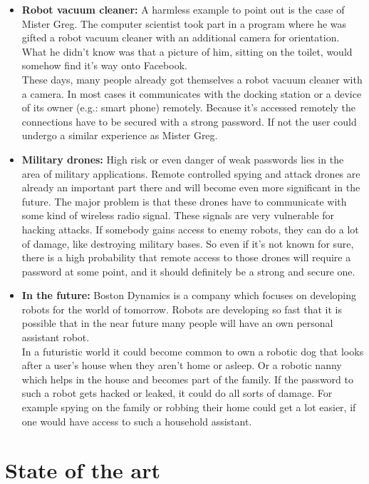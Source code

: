 \documentclass[conference]{IEEEtran}
\begin{document}
\begin{itemize}
    \item \textbf{Robot vacuum cleaner:} A harmless example to point out is the case of Mister Greg. The computer scientist took part in a program where he was gifted a robot vacuum cleaner with an additional camera for orientation. What he didn't know was that a picture of him, sitting on the toilet, would somehow find it's way onto Facebook. \cite{b10}\\
          These days, many people already got themselves a robot vacuum cleaner with a camera. In most cases it communicates with the docking station or a device of its owner (e.g.: smart phone) remotely. Because it's accessed remotely the connections have to be secured with a strong password. If not the user could undergo a similar experience as Mister Greg.
    \item \textbf{Military drones:} High risk or even danger of weak passwords lies in the area of military applications. Remote controlled spying and attack drones are already an important part there and will become even more significant in the future. The major problem is that these drones have to communicate with some kind of wireless radio signal. These signals are very vulnerable for hacking attacks. If somebody gains access to enemy robots, they can do a lot of damage, like destroying military bases. So even if it's not known for sure, there is a high probability that remote access to those drones will require a password at some point, and it should definitely be a strong and secure one.
    \item \textbf{In the future:} Boston Dynamics is a company which focuses on developing robots for the world of tomorrow. Robots are developing so fast that it is possible that in the near future many people will have an own personal assistant robot. \cite{b12}\\
          In a futuristic world it could become common to own a robotic dog that looks after a user's house when they aren't home or asleep. Or a robotic nanny which helps in the house and becomes part of the family. If the password to such a robot gets hacked or leaked, it could do all sorts of damage. For example spying on the family or robbing their home could get a lot easier, if one would have access to such a household assistant.
\end{itemize}

\section{State of the art}
\end{document}
